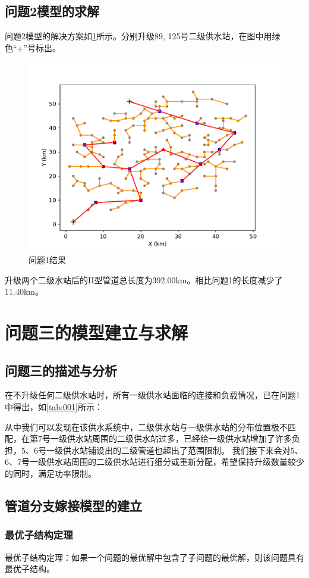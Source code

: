 \documentclass{cumcmthesis}
\begin{document}
\subsection{问题2模型的求解}
问题2模型的解决方案如\cref{fig:solution2}所示。分别升级89, 125号二级供水站，在图中用绿色“+”号标出。
  \begin{figure}[!h]
    \centering
    \includegraphics[width=.9\textwidth]{figure/pipelineAfterUpgrade.pdf}
    \caption{问题1结果}
    \label{fig:solution2}
  \end{figure}
  升级两个二级水站后的II型管道总长度为392.00km。相比问题1的长度减少了11.40km。


\section{问题三的模型建立与求解}
\subsection{问题三的描述与分析}
  在不升级任何二级供水站时，所有一级供水站面临的连接和负载情况，已在问题1中得出，如\cref{tab:001}所示：

    从中我们可以发现在该供水系统中，二级供水站与一级供水站的分布位置极不匹配，在第7号一级供水站周围的二级供水站过多，已经给一级供水站增加了许多负担，5、6号一级供水站铺设出的二级管道也超出了范围限制。
    我们接下来会对5、6、7号一级供水站周围的二级供水站进行细分或重新分配，希望保持升级数量较少的同时，满足功率限制。

\subsection{管道分支嫁接模型的建立}
  \subsubsection{最优子结构定理}
    \begin{theorem}
      最优子结构定理：如果一个问题的最优解中包含了子问题的最优解，则该问题具有最优子结构。
      \label{thm:best_sub}
    \end{theorem}
    
\end{document}
